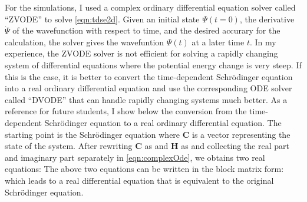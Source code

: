 For the simulations, I used a complex ordinary differential equation solver called ``ZVODE''\cite{vode, odepack} to solve 
\autoref{eqn:tdse2d}. Given an initial state $\Psi(t=0)$, the
derivative $\dot{\Psi}$ of the wavefunction with respect to time, and the desired accurary for the calculation,
the solver gives the wavefuntion $\Psi(t)$ at a later time $t$. In my experience, the ZVODE solver is not 
efficient for solving a rapidly changing system of differential equations where the potential energy change is very steep. 
If this is the case, it is better to convert
the time-dependent Schr\"odinger equation into a real  ordinary differential equation and use the corresponding
ODE solver called ``DVODE''\cite{vode, odepack} that can handle rapidly changing systems much better. As a reference
 for future students, I show below the conversion from the time-dependent Schr\"odinger equation to a real 
ordinary differential equation. The starting point is the Schr\"odinger equation 
where $\mathbf{C}$ is a vector representing the state of the system. After rewriting $\mathbf{C}$ as 
and  $\mathbf{H}$ as
and collecting the real part and imaginary part separately in \autoref{eqn:complexOde}, we obtains two real 
equations:
The above two equations can be written  in the block matrix form:
which leads to  a real differential equation
that is equivalent to the original Schr\"odinger equation. 
 
